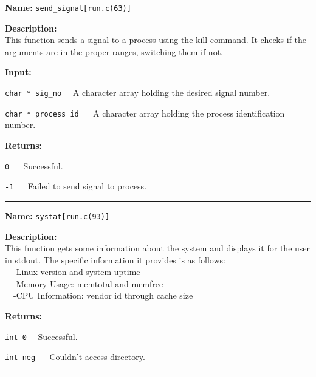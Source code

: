 \documentclass[11pt,a4paper]{article}
\begin{document}
\begin{description}
\item \textbf{Name:} 
\verb|send_signal[run.c(63)]|

\item \textbf{Description:}\\
This function sends a signal to a process using the kill command. It checks if the arguments are in the proper ranges, switching them if not.

\item \textbf{Input:}
\begin{description}
\item \verb|char * sig_no|~~ A character array holding the desired signal number.
\item \verb|char * process_id| ~~ A character array holding the process identification number.
\end{description}

\item \textbf{Returns:}
\begin{description}
\item \verb|0|  ~~ Successful.
\item \verb|-1| ~~ Failed to send signal to process.
\end{description}
\end{description}\hrule

\begin{description}
\item \textbf{Name:} 
\verb|systat[run.c(93)]|

\item \textbf{Description:}\\
This function gets some information about the system and displays it for the
user in stdout. The specific information it provides is as follows:\\
~~-Linux version and system uptime\\
~~-Memory Usage: memtotal and memfree\\
~~-CPU Information: vendor id through cache size

\item \textbf{Returns:}
\begin{description}
\item \verb|int 0|~~ Successful.
\item \verb|int neg| ~~ Couldn't access directory.
\end{description}
\end{description}\hrule
\end{document}
